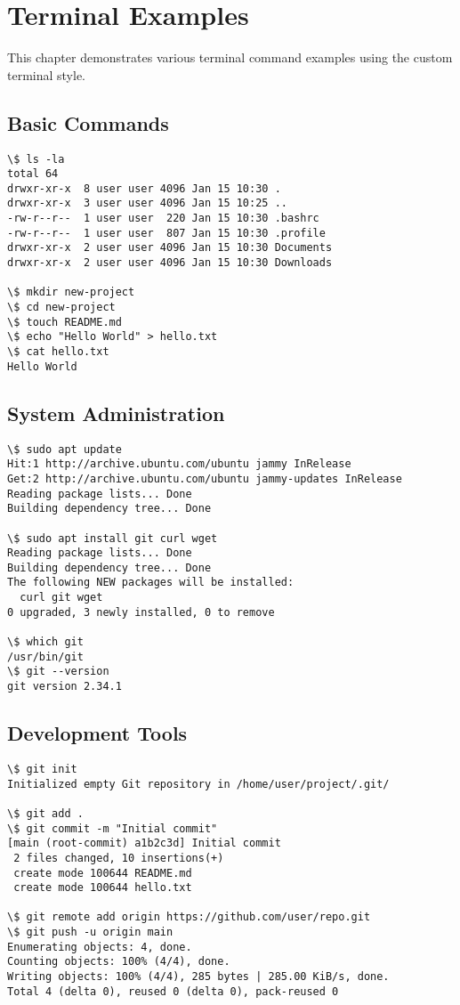 \chapter{Terminal Examples}

This chapter demonstrates various terminal command examples using the custom terminal style.

\section{Basic Commands}

\begin{lstlisting}[style=terminal, caption=File Operations]
\$ ls -la
total 64
drwxr-xr-x  8 user user 4096 Jan 15 10:30 .
drwxr-xr-x  3 user user 4096 Jan 15 10:25 ..
-rw-r--r--  1 user user  220 Jan 15 10:30 .bashrc
-rw-r--r--  1 user user  807 Jan 15 10:30 .profile
drwxr-xr-x  2 user user 4096 Jan 15 10:30 Documents
drwxr-xr-x  2 user user 4096 Jan 15 10:30 Downloads

\$ mkdir new-project
\$ cd new-project
\$ touch README.md
\$ echo "Hello World" > hello.txt
\$ cat hello.txt
Hello World
\end{lstlisting}

\section{System Administration}

\begin{lstlisting}[style=terminal, caption=Package Management]
\$ sudo apt update
Hit:1 http://archive.ubuntu.com/ubuntu jammy InRelease
Get:2 http://archive.ubuntu.com/ubuntu jammy-updates InRelease
Reading package lists... Done
Building dependency tree... Done

\$ sudo apt install git curl wget
Reading package lists... Done
Building dependency tree... Done
The following NEW packages will be installed:
  curl git wget
0 upgraded, 3 newly installed, 0 to remove

\$ which git
/usr/bin/git
\$ git --version
git version 2.34.1
\end{lstlisting}

\section{Development Tools}

\begin{lstlisting}[style=terminal, caption=Git Operations]
\$ git init
Initialized empty Git repository in /home/user/project/.git/

\$ git add .
\$ git commit -m "Initial commit"
[main (root-commit) a1b2c3d] Initial commit
 2 files changed, 10 insertions(+)
 create mode 100644 README.md
 create mode 100644 hello.txt

\$ git remote add origin https://github.com/user/repo.git
\$ git push -u origin main
Enumerating objects: 4, done.
Counting objects: 100% (4/4), done.
Writing objects: 100% (4/4), 285 bytes | 285.00 KiB/s, done.
Total 4 (delta 0), reused 0 (delta 0), pack-reused 0
\end{lstlisting}

